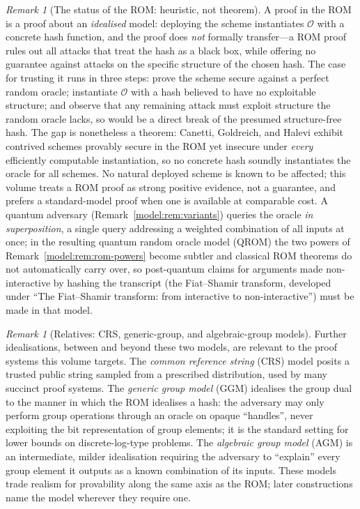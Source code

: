 \documentclass[11pt,a4paper]{article}
\theoremstyle{definition}
\theoremstyle{remark}
\newtheorem{remark}[theorem]{Remark}
\begin{document}
\begin{remark}[The status of the ROM: heuristic, not theorem]
\label{model:rem:rom-caveat}
A proof in the ROM is a proof about an \emph{idealised} model:
deploying the scheme instantiates \(\mathcal{O}\) with a concrete
hash function, and the proof does \emph{not} formally transfer---a ROM
proof rules out all attacks that treat the hash as a black box, while
offering no guarantee against attacks on the specific structure of the
chosen hash. The case for trusting it runs in three steps: prove the
scheme secure against a perfect random oracle; instantiate
\(\mathcal{O}\) with a hash believed to have no exploitable structure;
and observe that any remaining attack must exploit structure the
random oracle lacks, so would be a direct break of the presumed
structure-free hash. The gap is nonetheless a theorem: Canetti,
Goldreich, and Halevi exhibit contrived schemes provably secure in
the ROM yet insecure under \emph{every} efficiently computable
instantiation, so no concrete hash soundly instantiates the oracle
for all schemes. No natural deployed scheme is known to be affected;
this volume treats a ROM proof as strong positive evidence, not a
guarantee, and prefers a standard-model proof when one is available at
comparable cost. A quantum
adversary (Remark~\ref{model:rem:variants}) queries the oracle \emph{in
superposition}, a single query addressing a weighted combination of
all inputs at once; in the resulting quantum random oracle model
(QROM) the two powers of Remark~\ref{model:rem:rom-powers} become
subtler and classical ROM theorems do not automatically carry over,
so post-quantum claims for arguments made non-interactive by hashing
the transcript (the Fiat--Shamir transform, developed under ``The
Fiat--Shamir transform: from interactive to non-interactive'') must
be made in that model.
\end{remark}

\begin{remark}[Relatives: CRS, generic-group, and algebraic-group
models]\label{model:rem:other-models}
Further idealisations, between and beyond these two models, are
relevant to the proof systems this volume targets. The \emph{common
reference string} (CRS) model posits a trusted public string sampled from a
prescribed distribution, used by many succinct proof systems. The
\emph{generic group model} (GGM) idealises the group dual to the
manner in which the ROM idealises a hash: the adversary may only
perform group operations through an oracle on opaque ``handles'',
never exploiting the bit representation of group elements; it is the
standard setting for lower bounds on discrete-log-type problems. The
\emph{algebraic group model} (AGM) is an intermediate, milder
idealisation requiring the adversary to ``explain'' every group
element it outputs as a known combination of its inputs. These models
trade realism for provability along the same axis as the ROM; later
constructions name the model wherever they require one.
\end{remark}
\end{document}

